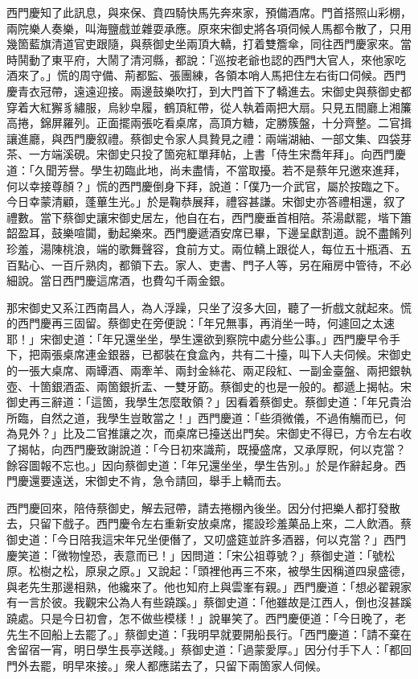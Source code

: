 西門慶知了此訊息，與來保、賁四騎快馬先奔來家，預備酒席。門首搭照山彩棚，兩院樂人奏樂，叫海鹽戲並雜耍承應。原來宋御史將各項伺候人馬都令散了，只用幾箇藍旗清道官吏跟隨，與蔡御史坐兩頂大轎，打着雙簷傘，同往西門慶家來。當時鬨動了東平府，大鬧了清河縣，都說：「巡按老爺也認的西門大官人，來他家吃酒來了。」慌的周守備、荊都監、張團練，各領本哨人馬把住左右街口伺候。西門慶青衣冠帶，遠遠迎接。兩邊鼓樂吹打，到大門首下了轎進去。宋御史與蔡御史都穿着大紅獬豸繡服，烏紗皁履，鶴頂紅帶，從人執着兩把大扇。只見五間廳上湘簾高捲，錦屏羅列。正面擺兩張吃看桌席，高頂方糖，定勝簇盤，十分齊整。二官揖讓進廳，與西門慶叙禮。蔡御史令家人具贄見之禮：兩端湖紬、一部文集、四袋芽茶、一方端溪硯。宋御史只投了箇宛紅單拜帖，上書「侍生宋喬年拜」。向西門慶道：「久聞芳譽。學生初臨此地，尚未盡情，不當取擾。若不是蔡年兄邀來進拜，何以幸接尊顏？」慌的西門慶倒身下拜，說道：「僕乃一介武官，屬於按臨之下。今日幸蒙清顧，蓬蓽生光。」於是鞠恭展拜，禮容甚謙。宋御史亦答禮相還，叙了禮數。當下蔡御史讓宋御史居左，他自在右，西門慶垂首相陪。茶湯獻罷，堦下簫韶盈耳，鼓樂喧闐，動起樂來。西門慶遞酒安席已畢，下邊呈獻割道。說不盡餚列珍羞，湯陳桃浪，端的歌舞聲容，食前方丈。兩位轎上跟從人，每位五十瓶酒、五百點心、一百斤熟肉，都領下去。家人、吏書、門子人等，另在廂房中管待，不必細說。當日西門慶這席酒，也費勾千兩金銀。

那宋御史又系江西南昌人，為人浮躁，只坐了沒多大回，聽了一折戲文就起來。慌的西門慶再三固留。蔡御史在旁便說：「年兄無事，再消坐一時，何遽回之太速耶！」宋御史道：「年兄還坐坐，學生還欲到察院中處分些公事。」西門慶早令手下，把兩張桌席連金銀器，已都裝在食盒內，共有二十擡，叫下人夫伺候。宋御史的一張大桌席、兩罈酒、兩牽羊、兩封金絲花、兩疋段紅、一副金臺盤、兩把銀執壺、十箇銀酒盃、兩箇銀折盂、一雙牙筯。蔡御史的也是一般的。都遞上揭帖。宋御史再三辭道：「這箇，我學生怎麼敢領？」因看着蔡御史。蔡御史道：「年兄貴治所臨，自然之道，我學生豈敢當之！」西門慶道：「些須微儀，不過侑觴而已，何為見外？」比及二官推讓之次，而桌席已擡送出門矣。宋御史不得已，方令左右收了揭帖，向西門慶致謝說道：「今日初來識荊，既擾盛席，又承厚貺，何以克當？餘容圖報不忘也。」因向蔡御史道：「年兄還坐坐，學生告別。」於是作辭起身。西門慶還要遠送，宋御史不肯，急令請回，舉手上轎而去。

西門慶回來，陪侍蔡御史，解去冠帶，請去捲棚內後坐。因分付把樂人都打發散去，只留下戲子。西門慶令左右重新安放桌席，擺設珍羞菓品上來，二人飲酒。蔡御史道：「今日陪我這宋年兄坐便僭了，又叨盛筵並許多酒器，何以克當？」西門慶笑道：「微物惶恐，表意而已！」因問道：「宋公祖尊號？」蔡御史道：「號松原。松樹之松，原泉之原。」又說起：「頭裡他再三不來，被學生因稱道四泉盛德，與老先生那邊相熟，他纔來了。他也知府上與雲峯有親。」西門慶道：「想必翟親家有一言於彼。我觀宋公為人有些蹺蹊。」蔡御史道：「他雖故是江西人，倒也沒甚蹊蹺處。只是今日初會，怎不做些模樣！」說畢笑了。西門慶便道：「今日晚了，老先生不回船上去罷了。」蔡御史道：「我明早就要開船長行。「西門慶道：「請不棄在舍留宿一宵，明日學生長亭送餞。」蔡御史道：「過蒙愛厚。」因分付手下人：「都回門外去罷，明早來接。」衆人都應諾去了，只留下兩箇家人伺候。

